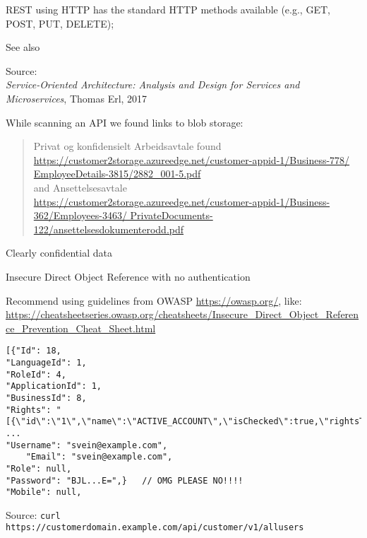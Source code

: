 \documentclass[Screen16to9,17pt]{foils}
\begin{document}


\begin{list2}
\item REST using HTTP has the standard HTTP methods available (e.g., GET, POST, PUT, DELETE);
\item See also 
\end{list2}
Source: {\footnotesize\\
\emph{Service‑Oriented Architecture: Analysis and Design for Services and Microservices}, Thomas Erl, 2017}





While scanning an API we found links to blob storage:
\begin{quote}
    Privat og konfidensielt Arbeidsavtale found\\{\footnotesize
    \url{https://customer2storage.azureedge.net/customer-appid-1/Business-778/
EmployeeDetails-3815/2882_001-5.pdf}}\\
and Ansettelsesavtale\\ {\footnotesize\url{https://customer2storage.azureedge.net/customer-appid-1/Business-362/Employees-3463/
PrivateDocuments-122/ansettelsesdokumenterodd.pdf}}
\end{quote}
Clearly confidential data

\begin{list2}
    \item Insecure Direct Object Reference with no authentication
    \item Recommend using guidelines from OWASP \url{https://owasp.org/}, like:\\{\footnotesize
    \url{https://cheatsheetseries.owasp.org/cheatsheets/Insecure_Direct_Object_Reference_Prevention_Cheat_Sheet.html}}
\end{list2}



\begin{verbatim}
[{"Id": 18,
"LanguageId": 1,
"RoleId": 4,
"ApplicationId": 1,
"BusinessId": 8,
"Rights": "[{\"id\":\"1\",\"name\":\"ACTIVE_ACCOUNT\",\"isChecked\":true,\"rightsType\":1},
...
"Username": "svein@example.com",
    "Email": "svein@example.com",
"Role": null,
"Password": "BJL...E=",}   // OMG PLEASE NO!!!!
"Mobile": null,
\end{verbatim}
Source: \verb+curl https://customerdomain.example.com/api/customer/v1/allusers+
\end{document}
